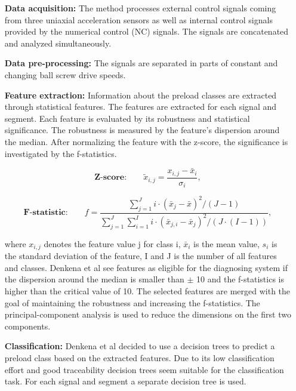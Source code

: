\begin{itemize}
    \item [\textbf{Data acquisition:}] The method processes external control signals coming from three uniaxial acceleration sensors as well as internal control signals provided by the numerical control (NC) signals. The signals are concatenated and analyzed simultaneously.
    \item [\textbf{Data pre-processing:}] The signals are separated in parts of constant and changing ball screw drive speeds. 
    \item [\textbf{Feature extraction:}] Information about the preload classes are extracted through statistical features. The features are extracted for each signal and segment. Each feature is evaluated by its robustness and statistical significance. The robustness is measured by the feature's dispersion around the median. After normalizing the feature with the z-score, the significance is investigated by the f-statistics.
    
    \begin{equation}
        \textbf{Z-score:}\qquad \tilde{x}_{i,j} = \frac{x_{i,j} - \bar x_{i}}{\sigma_{i}},
    \end{equation}
    
    \begin{equation}
        \textbf{F-statistic:}\qquad f = \frac{\sum_{j=1}^{J} i \cdot (\bar x_{j} -\bar x)^{2}/(J-1)}{\sum_{j=1}^{J} \sum_{i=1}^{I} i \cdot (\bar x_{j,i} -\bar x_{j})^{2}/(J \cdot (I-1))},
    \end{equation}

    where ${x}_{i,j}$  denotes the feature value j for class i, $\bar {x}_{i}$ is the mean value,  ${s}_{i}$ is the standard deviation of the feature, I and J is the number of all features and classes. Denkena et al see features as eligible for the diagnosing system if the dispersion around the median is smaller than $\pm$ 10 and the f-statistics is higher than the critical value of 10. The selected features are merged with the goal of maintaining the robustness and increasing the f-statistics. The principal-component analysis is used to reduce the dimensions on the first two components.
    

    \item [\textbf{Classification:}] Denkena et al decided to use a decision trees to predict a preload class based on the extracted features. Due to its low classification effort and good traceability  decision trees seem suitable for the classification task. For each signal and segment a separate decision tree is used. 
\end{itemize}



